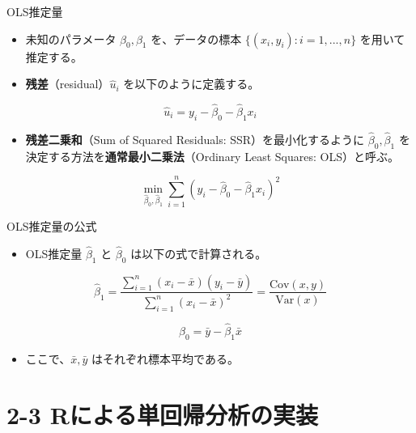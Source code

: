 \documentclass[
  ignorenonframetext,
]{beamer}
\providecommand{\tightlist}{%
  \setlength{\itemsep}{0pt}\setlength{\parskip}{0pt}}
\begin{document}
\begin{frame}{OLS推定量}
\protect\hypertarget{olsux63a8ux5b9aux91cf}{}
\begin{itemize}
\tightlist
\item
  未知のパラメータ \(\beta_0, \beta_1\) を、データの標本
  \(\{(x_i, y_i): i=1, ..., n\}\) を用いて推定する。
\item
  \textbf{残差}（residual）\(\hat{u}_i\) を以下のように定義する。
\end{itemize}

\[ \hat{u}_i = y_i - \hat{\beta}_0 - \hat{\beta}_1 x_i \]

\begin{itemize}
\tightlist
\item
  \textbf{残差二乗和}（Sum of Squared Residuals: SSR）を最小化するように
  \(\hat{\beta}_0, \hat{\beta}_1\)
  を決定する方法を\textbf{通常最小二乗法}（Ordinary Least Squares:
  OLS）と呼ぶ。
\end{itemize}

\[ \min_{\hat{\beta}_0, \hat{\beta}_1} \sum_{i=1}^n (y_i - \hat{\beta}_0 - \hat{\beta}_1 x_i)^2 \]
\end{frame}

\begin{frame}{OLS推定量の公式}
\protect\hypertarget{olsux63a8ux5b9aux91cfux306eux516cux5f0f}{}
\begin{itemize}
\tightlist
\item
  OLS推定量 \(\hat{\beta}_1\) と \(\hat{\beta}_0\)
  は以下の式で計算される。
\end{itemize}

\[ \hat{\beta}_1 = \frac{\sum_{i=1}^n (x_i - \bar{x})(y_i - \bar{y})}{\sum_{i=1}^n (x_i - \bar{x})^2} = \frac{\text{Cov}(x, y)}{\text{Var}(x)} \]

\[ \hat{\beta}_0 = \bar{y} - \hat{\beta}_1 \bar{x} \]

\begin{itemize}
\tightlist
\item
  ここで、\(\bar{x}, \bar{y}\) はそれぞれ標本平均である。
\end{itemize}
\end{frame}

\hypertarget{rux306bux3088ux308bux5358ux56deux5e30ux5206ux6790ux306eux5b9fux88c5}{%
\section{2-3
Rによる単回帰分析の実装}\label{rux306bux3088ux308bux5358ux56deux5e30ux5206ux6790ux306eux5b9fux88c5}}
\end{document}
